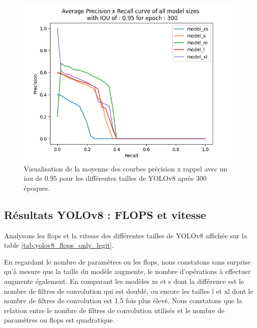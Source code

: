 \begin{figure}[hbt!]
    \centering
    \includegraphics[scale=0.7]{Figures/results/yolov8/apxr_095_300.png}
    \caption{Visualisation de la moyenne des courbes précision x rappel avec un \acrshort{iou} de 0.95 pour les différentes tailles de YOLOv8 après 300 époques.}
    \label{fig:yolov8_visulization_apxr095_standard_models}
\end{figure}


\subsection{Résultats YOLOv8 : FLOPS et vitesse}
\label{subsec:results_yolov8_flops_vitesse}

Analysons les \acrfull{flops} et la vitesse des différentes tailles de YOLOv8 affichée sur la table \ref{tab:yolov8_flops_only_legit}.

En regardant le nombre de paramètres ou les \acrshort{flops}, nous constatons sans surprise qu'à mesure que la taille du modèle augmente, le nombre d'opérations à effectuer augmente également. En comparant les modèles xs et s dont la différence est le nombre de filtres de convolution qui est doublé, ou encore les tailles l et xl dont le nombre de filtres de convolution est 1.5 fois plus élevé. Nous constatons que la relation entre le nombre de filtres de convolution utilisés et le nombre de paramètres ou \acrshort{flops} est quadratique.

